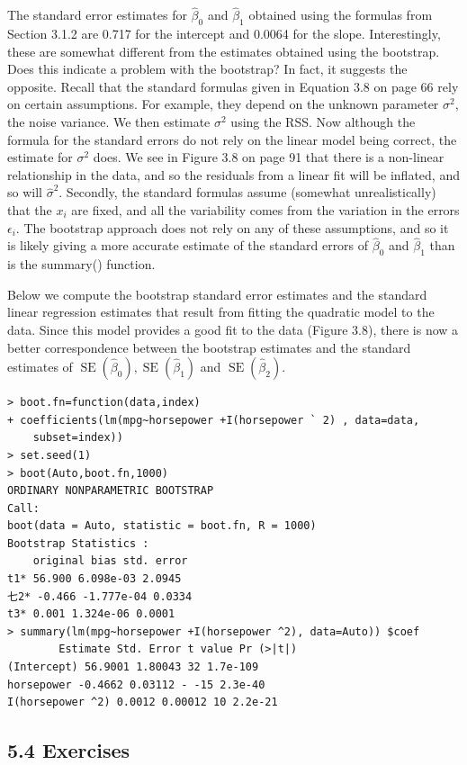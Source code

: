\documentclass[10pt]{article}
\begin{document}
The standard error estimates for $\hat{\beta}_{0}$ and $\hat{\beta}_{1}$ obtained using the formulas from Section 3.1.2 are 0.717 for the intercept and 0.0064 for the slope. Interestingly, these are somewhat different from the estimates obtained using the bootstrap. Does this indicate a problem with the bootstrap? In fact, it suggests the opposite. Recall that the standard formulas given in Equation 3.8 on page 66 rely on certain assumptions. For example, they depend on the unknown parameter $\sigma^{2}$, the noise variance. We then estimate $\sigma^{2}$ using the RSS. Now although the formula for the standard errors do not rely on the linear model being correct, the estimate for $\sigma^{2}$ does. We see in Figure 3.8 on page 91 that there is a non-linear relationship in the data, and so the residuals from a linear fit will be inflated, and so will $\hat{\sigma}^{2}$. Secondly, the standard formulas assume (somewhat unrealistically) that the $x_{i}$ are fixed, and all the variability comes from the variation in the errors $\epsilon_{i}$. The bootstrap approach does not rely on any of these assumptions, and so it is likely giving a more accurate estimate of the standard errors of $\hat{\beta}_{0}$ and $\hat{\beta}_{1}$ than is the summary() function.

Below we compute the bootstrap standard error estimates and the standard linear regression estimates that result from fitting the quadratic model to the data. Since this model provides a good fit to the data (Figure 3.8), there is now a better correspondence between the bootstrap estimates and the standard estimates of $\operatorname{SE}\left(\hat{\beta}_{0}\right), \operatorname{SE}\left(\hat{\beta}_{1}\right)$ and $\operatorname{SE}\left(\hat{\beta}_{2}\right)$.

\begin{verbatim}
> boot.fn=function(data,index)
+ coefficients(lm(mpg~horsepower +I(horsepower ` 2) , data=data,
    subset=index))
> set.seed(1)
> boot(Auto,boot.fn,1000)
ORDINARY NONPARAMETRIC BOOTSTRAP
Call:
boot(data = Auto, statistic = boot.fn, R = 1000)
Bootstrap Statistics :
    original bias std. error
t1* 56.900 6.098e-03 2.0945
七2* -0.466 -1.777e-04 0.0334
t3* 0.001 1.324e-06 0.0001
> summary(lm(mpg~horsepower +I(horsepower ^2), data=Auto)) $coef
        Estimate Std. Error t value Pr (>|t|)
(Intercept) 56.9001 1.80043 32 1.7e-109
horsepower -0.4662 0.03112 - -15 2.3e-40
I(horsepower ^2) 0.0012 0.00012 10 2.2e-21
\end{verbatim}

\subsection*{5.4 Exercises}
\end{document}

